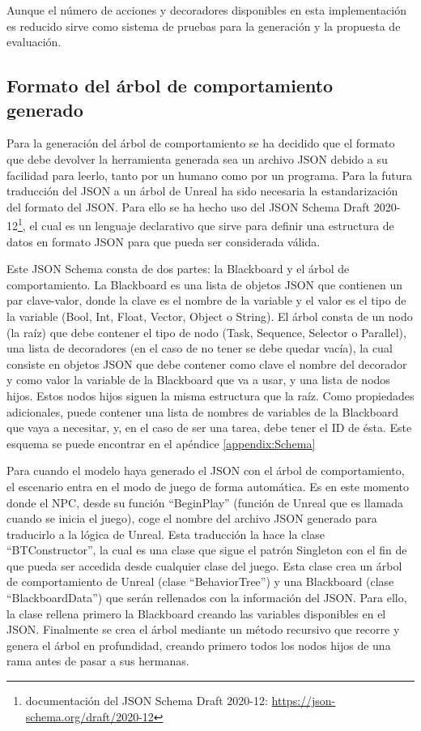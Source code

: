 Aunque el número de acciones y decoradores disponibles en esta implementación es reducido sirve como sistema de pruebas para la generación y la propuesta de evaluación.

\subsection{Formato del árbol de comportamiento generado}

Para la generación del árbol de comportamiento se ha decidido que el formato que debe devolver la herramienta generada sea un archivo JSON debido a su facilidad para leerlo, tanto por un humano como por un programa.
Para la futura traducción del JSON a un árbol de Unreal ha sido necesaria la estandarización del formato del JSON.
Para ello se ha hecho uso del JSON Schema Draft 2020-12\footnote{documentación del JSON Schema Draft 2020-12: \url{https://json-schema.org/draft/2020-12}}, el cual es un lenguaje declarativo que sirve para definir una estructura de datos en formato JSON para que pueda ser considerada válida.

Este JSON Schema consta de dos partes: la Blackboard y el árbol de comportamiento.
La Blackboard es una lista de objetos JSON que contienen un par clave-valor, donde la clave es el nombre de la variable y el valor es el tipo de la variable (Bool, Int, Float, Vector, Object o String).
El árbol consta de un nodo (la raíz) que debe contener el tipo de nodo (Task, Sequence, Selector o Parallel), una lista de decoradores (en el caso de no tener se debe quedar vacía), la cual consiste en objetos JSON que debe contener como clave el nombre del decorador y como valor la variable de la Blackboard que va a usar, y una lista de nodos hijos.
Estos nodos hijos siguen la misma estructura que la raíz.
Como propiedades adicionales, puede contener una lista de nombres de variables de la Blackboard que vaya a necesitar, y, en el caso de ser una tarea, debe tener el ID de ésta.
Este esquema se puede encontrar en el apéndice \ref{appendix:Schema}

Para cuando el modelo haya generado el JSON con el árbol de comportamiento, el escenario entra en el modo de juego de forma automática.
Es en este momento donde el NPC, desde su función ``BeginPlay'' (función de Unreal que es llamada cuando se inicia el juego), coge el nombre del archivo JSON generado para traducirlo a la lógica de Unreal.
Esta traducción la hace la clase ``BTConstructor'', la cual es una clase que sigue el patrón Singleton con el fin de que pueda ser accedida desde cualquier clase del juego.
Esta clase crea un árbol de comportamiento de Unreal (clase ``BehaviorTree'') y una Blackboard (clase ``BlackboardData'') que serán rellenados con la información del JSON.
Para ello, la clase rellena primero la Blackboard creando las variables disponibles en el JSON.
Finalmente se crea el árbol mediante un método recursivo que recorre y genera el árbol en profundidad, creando primero todos los nodos hijos de una rama antes de pasar a sus hermanas.

